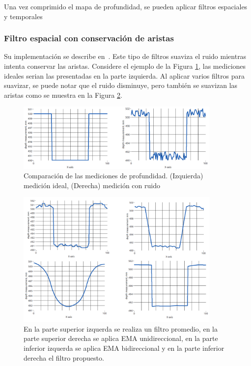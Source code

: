 Una vez comprimido el mapa de profundidad, se pueden aplicar filtros espaciales y temporales

\subsubsection{Filtro espacial con conservación de aristas}

Su implementación se describe en~\cite{gastal2011domain}. Este tipo de filtros suaviza el ruido mientras intenta conservar las aristas. Considere el ejemplo de la Figura \ref{fig:space1}, las mediciones ideales serian las presentadas en la parte izquierda. Al aplicar varios filtros para suavizar, se puede notar que el ruido disminuye, pero también se suavizan las aristas como se muestra en la Figura \ref{fig:space2}.

\begin{figure}[ht]
	\centering
	\includegraphics[width=10cm]{./Graphics/figura1.png}
	\caption{Comparación de las mediciones de profundidad. (Izquierda) medición ideal, (Derecha) medición con ruido}
	\label{fig:space1}
\end{figure}

\begin{figure}[ht]
	\centering
	\includegraphics[width=10cm]{./Graphics/figura2.png}
	\caption{En la parte superior izquerda se realiza un filtro promedio, en la parte	superior derecha se aplica EMA unidireccional, en la parte inferior izquerda se aplica EMA bidireccional y en la parte inferior derecha el filtro propuesto.}
	\label{fig:space2}
\end{figure}

